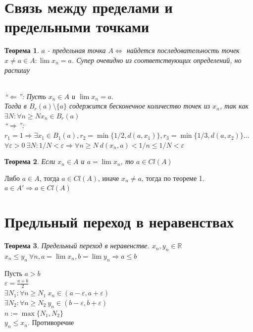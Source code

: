 \documentclass[12pt,letterpaper]{report}
\makeatletter
\newtheorem*{theorem-non}{Теорема}
\theoremstyle{definition}
\renewenvironment{proof}[1][\proofname]{%
   \par\pushQED{\qed}\normalfont%
   \topsep6\p@\@plus6\p@\relax
   \trivlist\item[\hskip\labelsep\bfseries#1\@addpunct{.}]%
   \ignorespaces
}{%
   \popQED\endtrivlist\@endpefalse
}
\makeatother
\begin{document}
    \section{Связь между пределами и предельными точками}
    
    \begin{theorem-non}
        $a$ - предельная точка $A \Longleftrightarrow$ найдется последовательность точек $x\neq a \in A : \lim x_n = a$. Супер очевидно из соответствующих определений, но распишу
        \begin{proof}
            \quad \\
            ``$\Longleftarrow$'': \quad Пусть $x_n \in A$ и $\lim x_n = a$. \\
            Тогда в $B_r(a)\setminus \{a\}$ содержится бесконечное количество точек из $x_n$, так как $\exists N : \forall n \geq N x_n \in B_r(a)$ \\
            ``$\Longrightarrow$'': \quad
            $r_1 = 1 \Longrightarrow \exists x_1 \in B_1(a), r_2 = \min\{1/2, d(a, x_1)\}, r_3=\min\{1/3, d(a, x_2)\}...$ \\
            $\forall \varepsilon>0\ \exists N: 1/N<\varepsilon \Longrightarrow \forall n\geq N\ d(x_n, a) < 1/n \leq 1/N < \varepsilon$
        \end{proof}
    \end{theorem-non}
    
    
    
    \begin{theorem-non}
        Если $x_n \in A$ и $a=\lim x_n$, то $a \in Cl(A)$
    \end{theorem-non}
    \begin{proof}
        Либо $a\in A$, тогда $a \in Cl(A)$, иначе $x_n \neq a$, тогда по теореме 1. $a \in A' \Longrightarrow a \in Cl(A)$
    \end{proof}

    \section{Предльный переход в неравенствах}

    
    \begin{theorem-non}
        Предельный переход в неравенстве. $x_n, y_n \in \mathbb{R}$ \\
        $x_n \leq y_n\ \forall n, a=\lim x_n, b=\lim y_n \Longrightarrow a\leq b$
    \end{theorem-non}
        
    \begin{proof}
        Пусть $a>b$ \\
        $\varepsilon = \frac{a+b}{2}$ \\
        $\exists N_1: \forall n\geq N_1\ x_n\in (a-\varepsilon, a+\varepsilon)$ \\
        $\exists N_2: \forall n\geq N_2\ y_n \in (b-\varepsilon, b+\varepsilon)$ \\
        $n:=\max\{N_1, N_2\}$ \\
        $y_n \leq x_n$. Противоречие
    \end{proof}
    
\end{document}
